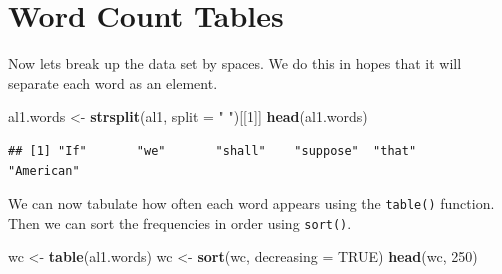 \documentclass[
]{book}
\newenvironment{Shaded}{\begin{snugshade}}{\end{snugshade}}
\newcommand{\DataTypeTok}[1]{\textcolor[rgb]{0.13,0.29,0.53}{#1}}
\newcommand{\DecValTok}[1]{\textcolor[rgb]{0.00,0.00,0.81}{#1}}
\newcommand{\KeywordTok}[1]{\textcolor[rgb]{0.13,0.29,0.53}{\textbf{#1}}}
\newcommand{\NormalTok}[1]{#1}
\newcommand{\OtherTok}[1]{\textcolor[rgb]{0.56,0.35,0.01}{#1}}
\newcommand{\StringTok}[1]{\textcolor[rgb]{0.31,0.60,0.02}{#1}}
\begin{document}
\hypertarget{word-count-tables}{%
\section{Word Count Tables}\label{word-count-tables}}

Now lets break up the data set by spaces. We do this in hopes that it will separate each word as an element.

\begin{Shaded}
\begin{Highlighting}[]
\NormalTok{al1.words <-}\StringTok{ }\KeywordTok{strsplit}\NormalTok{(al1, }\DataTypeTok{split =} \StringTok{" "}\NormalTok{)[[}\DecValTok{1}\NormalTok{]]}
\KeywordTok{head}\NormalTok{(al1.words)}
\end{Highlighting}
\end{Shaded}

\begin{verbatim}
## [1] "If"       "we"       "shall"    "suppose"  "that"     "American"
\end{verbatim}

We can now tabulate how often each word appears using the \texttt{table()} function. Then we can sort the frequencies in order using \texttt{sort()}.

\begin{Shaded}
\begin{Highlighting}[]
\NormalTok{wc <-}\StringTok{ }\KeywordTok{table}\NormalTok{(al1.words)}
\NormalTok{wc <-}\StringTok{ }\KeywordTok{sort}\NormalTok{(wc, }\DataTypeTok{decreasing =} \OtherTok{TRUE}\NormalTok{)}
\KeywordTok{head}\NormalTok{(wc, }\DecValTok{250}\NormalTok{)}
\end{Highlighting}
\end{Shaded}
\end{document}

